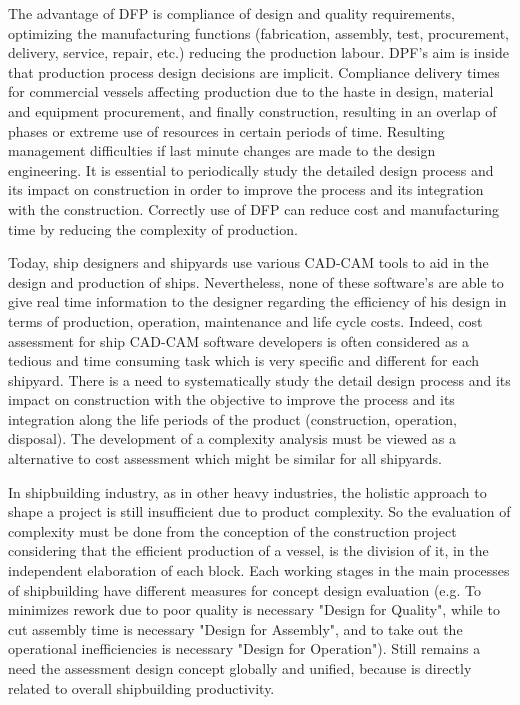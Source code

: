 The advantage of DFP is compliance of design and quality requirements, optimizing the manufacturing functions (fabrication, assembly, test, procurement, delivery, service, repair, etc.) reducing the production labour. DPF's aim is inside that production process design decisions are implicit.  Compliance delivery times for commercial vessels affecting production due to the haste in design, material and equipment procurement, and finally construction, resulting in an overlap of phases or extreme use of resources in certain periods of time. Resulting management difficulties if last minute changes are made to the design engineering. It is essential to periodically study the detailed design process and its impact on construction in order to improve the process and its integration with the construction. Correctly use of DFP  can reduce cost and manufacturing time by reducing the complexity of production.


Today, ship designers and shipyards use various CAD-CAM tools to aid in the design and production of ships. Nevertheless, none of these software's are able to give real time information to the designer regarding the efficiency of his design in terms of production, operation, maintenance and life cycle costs. Indeed, cost assessment for ship CAD-CAM software developers is often considered as a tedious and time consuming task which is very specific and different for each shipyard. There is a need to systematically study the detail design process and its impact on construction with the objective to improve the process and its integration along the life periods of the product (construction, operation, disposal). The development of a complexity analysis must be viewed as a alternative to cost assessment which might be similar for all shipyards.


In shipbuilding industry, as in other  heavy industries,  the holistic approach to shape a project is still insufficient  due to product complexity. So the evaluation of complexity must be done from the conception of the construction project considering that the efficient production of a vessel, is the division of it, in the independent elaboration of each block. Each working stages in the main processes of shipbuilding have different measures for concept design evaluation (e.g. To minimizes rework due to poor quality is necessary "Design for Quality", while to cut assembly time is necessary "Design for Assembly", and to take out the operational inefficiencies is necessary "Design for Operation"). Still remains a need the assessment design concept globally and unified, because is directly related to overall shipbuilding productivity.
